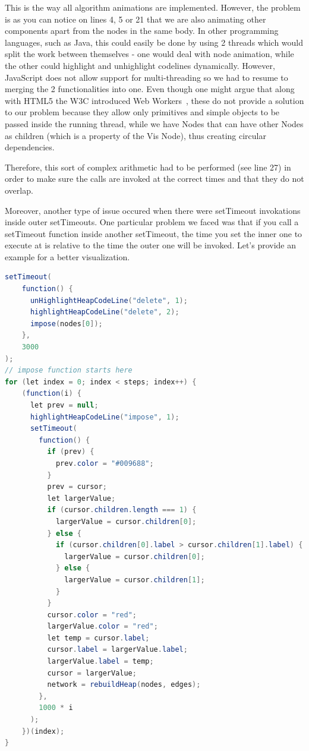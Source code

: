 \documentclass{l4proj}
\begin{document}
This is the way all algorithm animations are implemented. However, the problem is as you can notice on lines 4, 5 or 21
that we are also animating other components apart from the nodes in the same body. In other programming languages, such as Java, this
could easily be done by using 2 threads which would split the work between themselves - one would deal with node
animation, while the other could highlight and unhighlight codelines dynamically. However, JavaScript does not allow
support for multi-threading so we had to resume to merging the 2 functionalities into one. Even though one might argue
that along with HTML5 the W3C introduced Web Workers~\cite{web-worker}, these do not provide a solution to our problem
because they allow only primitives and simple objects to be passed inside the running thread, while we have Nodes that
can have other Nodes as children (which is a property of the Vis Node), thus creating circular dependencies.

Therefore, this sort of complex arithmetic had to be performed (see line 27) in order to make sure the calls are invoked at
the correct times and that they do not overlap. 

Moreover, another type of issue occured when there were setTimeout invokations inside outer setTimeouts. One particular
problem we faced was that if you call a setTimeout function inside another setTimeout, the time you set the inner one
to execute at is relative to the time the outer one will be invoked. Let's provide an example for a better
visualization.

\begin{lstlisting}[language=Java, caption=Heap animation that uses nested setTimeouts.]
setTimeout(
    function() {
      unHighlightHeapCodeLine("delete", 1);
      highlightHeapCodeLine("delete", 2);
      impose(nodes[0]);
    },
    3000
);
// impose function starts here
for (let index = 0; index < steps; index++) {
    (function(i) {
      let prev = null;
      highlightHeapCodeLine("impose", 1);
      setTimeout(
        function() {
          if (prev) {
            prev.color = "#009688";
          }
          prev = cursor;
          let largerValue;
          if (cursor.children.length === 1) {
            largerValue = cursor.children[0];
          } else {
            if (cursor.children[0].label > cursor.children[1].label) {
              largerValue = cursor.children[0];
            } else {
              largerValue = cursor.children[1];
            }
          }
          cursor.color = "red";
          largerValue.color = "red";
          let temp = cursor.label;
          cursor.label = largerValue.label;
          largerValue.label = temp;
          cursor = largerValue;
          network = rebuildHeap(nodes, edges);
        },
        1000 * i
      );
    })(index);
}
\end{lstlisting}
\end{document}
